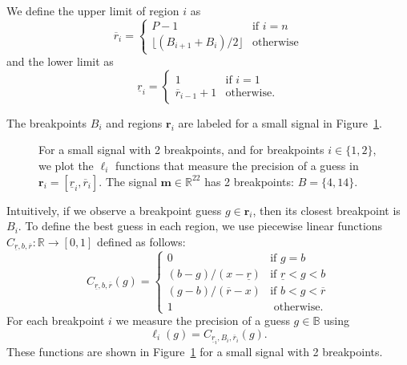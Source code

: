 \documentclass{jsfds} %
\renewcommand{\r}{ \mathbf{ r} }
\newcommand{\rileft}[1][i]{\underline r_{#1}}
\newcommand{\riright}[1][i]{\overline r_{#1}}
\newcommand{\RR}{\mathbb{R}}
\begin{document}
We define the upper limit of region $i$ as
\begin{equation}
  \label{eq:R_i}
\riright
=
  \begin{cases}
    P-1 & \text{if } i=n \\
    \lfloor (B_{i+1}+B_i)/2 \rfloor & \text{otherwise}
  \end{cases}
\end{equation}
and
the lower limit as
\begin{equation}
  \label{eq:L_i}
  \rileft =
  \begin{cases}
    1 & \text{if } i=1 \\
    \riright[i-1]+1 & \text{otherwise}.
  \end{cases}
\end{equation}

The breakpoints $B_i$ and regions $\r_i$ are labeled for a small
signal in Figure~\ref{fig:exact_imprecision}.

\begin{figure}[H]
  \centering
  
  \vskip -0.5cm
  \caption{For a small signal with 2 breakpoints, and for breakpoints
    $i\in\{1, 2\}$, we plot the $\ell_i$ functions that measure the
    precision of a guess in $\mathbf r_i = [\underline r_i, \overline
    r_i]$.  The signal $\mathbf m\in\RR^{22}$ has 2 breakpoints:
    $B=\{4,14\}$.}
  \label{fig:exact_imprecision}
\end{figure}


Intuitively, if we observe a breakpoint guess $g\in \r_i$, then its
closest breakpoint is $B_i$. To define the best guess in each region,
we use piecewise linear functions $C_{\underline r,b,\overline r}:\RR\rightarrow[0,1]$
defined as follows:
\begin{equation}
  \label{eq:cLxR}
  C_{\underline r,b,\overline r}(g) =
  \begin{cases}
    0 & \text{if }g=b \\
    (b-g)/(x-\underline r) & \text{if } \underline r< g< b \\
    (g-b)/(\overline r-x) & \text{if } b< g< \overline r\\
    1 & \text{ otherwise}.
  \end{cases}
\end{equation}
For each breakpoint $i$ we measure the precision of a guess
$g\in\mathbb B$ using
\begin{equation}
  \label{eq:ell_i_exact}
  \ell_i(g)=C_{\rileft,B_i,\riright}(g).
\end{equation}
These functions are shown in Figure~\ref{fig:exact_imprecision} for a
small signal with 2 breakpoints.
\end{document}
